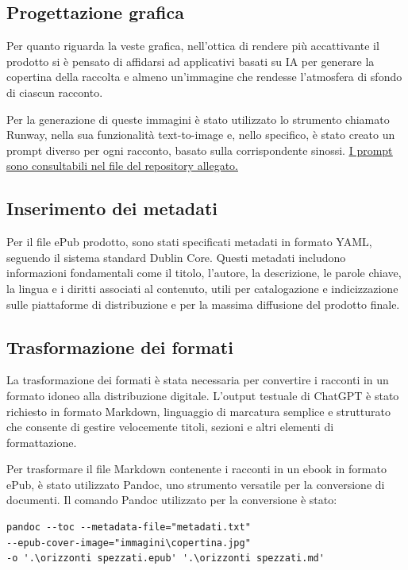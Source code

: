 \documentclass[a4paper,12pt]{article}
\begin{document}
\subsection*{Progettazione grafica}
Per quanto riguarda la veste grafica, nell'ottica di rendere più accattivante il prodotto si è pensato di affidarsi ad applicativi basati su IA per generare la copertina della raccolta e almeno un'immagine che rendesse l'atmosfera di sfondo di ciascun racconto. 

\bigbreak

Per la generazione di queste immagini è stato utilizzato lo strumento chiamato Runway, nella sua funzionalità text-to-image e, nello specifico, è stato creato un prompt diverso per ogni racconto, basato sulla corrispondente sinossi. \href{https://github.com/gianlucapironato/editoria_digitale/blob/main/immagini/prompt%20immagini.md}{\underline{I prompt sono consultabili nel file del repository allegato.}}

\subsection*{Inserimento dei metadati}

Per il file ePub prodotto, sono stati specificati metadati in formato YAML, seguendo il sistema standard Dublin Core. Questi metadati includono informazioni fondamentali come il titolo, l'autore, la descrizione, le parole chiave, la lingua e i diritti associati al contenuto, utili per catalogazione e indicizzazione sulle piattaforme di distribuzione e per la massima diffusione del prodotto finale.

\subsection*{Trasformazione dei formati}
La trasformazione dei formati è stata necessaria per convertire i racconti in un formato idoneo alla distribuzione digitale. L'output testuale di ChatGPT è stato richiesto in formato Markdown, linguaggio di marcatura semplice e strutturato che consente di gestire velocemente titoli, sezioni e altri elementi di formattazione.

\bigbreak

Per trasformare il file Markdown contenente i racconti in un ebook in formato ePub, è stato utilizzato Pandoc, uno strumento versatile per la conversione di documenti. Il comando Pandoc utilizzato per la conversione è stato:

\begin{lstlisting}
pandoc --toc --metadata-file="metadati.txt" 
--epub-cover-image="immagini\copertina.jpg"
-o '.\orizzonti spezzati.epub' '.\orizzonti spezzati.md'
\end{lstlisting}
\end{document}
